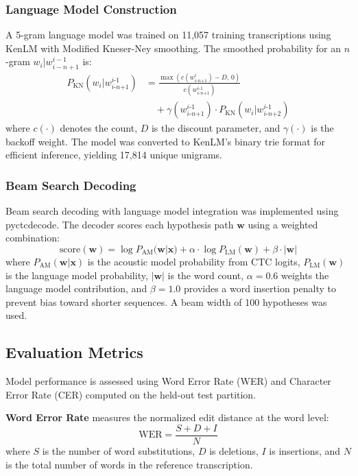 \documentclass[conference]{IEEEtran}
\begin{document}
\subsubsection{Language Model Construction}
A 5-gram language model was trained on 11,057 training transcriptions using KenLM \cite{b20} with Modified Kneser-Ney smoothing. The smoothed probability for an $n$-gram $w_i | w_{i-n+1}^{i-1}$ is:
\begin{align}
P_{\text{KN}}(w_i | w_{i\text{-}n\text{+}1}^{i\text{-}1}) &= \frac{\max(c(w_{i\text{-}n\text{+}1}^{i}) - D,\, 0)}{c(w_{i\text{-}n\text{+}1}^{i\text{-}1})} \nonumber \\
&\quad + \gamma(w_{i\text{-}n\text{+}1}^{i\text{-}1}) \cdot P_{\text{KN}}(w_i | w_{i\text{-}n\text{+}2}^{i\text{-}1})
\label{eq:kneserney}
\end{align}
where $c(\cdot)$ denotes the count, $D$ is the discount parameter, and $\gamma(\cdot)$ is the backoff weight. The model was converted to KenLM's binary trie format for efficient inference, yielding 17,814 unique unigrams.

\subsubsection{Beam Search Decoding}
Beam search decoding with language model integration was implemented using pyctcdecode. The decoder scores each hypothesis path $\mathbf{w}$ using a weighted combination:
\begin{equation}
\text{score}(\mathbf{w}) = \log P_{\text{AM}}(\mathbf{w} | \mathbf{x}) + \alpha \cdot \log P_{\text{LM}}(\mathbf{w}) + \beta \cdot |\mathbf{w}|
\label{eq:beam_score}
\end{equation}
where $P_{\text{AM}}(\mathbf{w} | \mathbf{x})$ is the acoustic model probability from CTC logits, $P_{\text{LM}}(\mathbf{w})$ is the language model probability, $|\mathbf{w}|$ is the word count, $\alpha = 0.6$ weights the language model contribution, and $\beta = 1.0$ provides a word insertion penalty to prevent bias toward shorter sequences. A beam width of 100 hypotheses was used.

\subsection{Evaluation Metrics}

Model performance is assessed using Word Error Rate (WER) and Character Error Rate (CER) computed on the held-out test partition.

\textbf{Word Error Rate} measures the normalized edit distance at the word level:
\begin{equation}
\text{WER} = \frac{S + D + I}{N}
\label{eq:wer}
\end{equation}
where $S$ is the number of word substitutions, $D$ is deletions, $I$ is insertions, and $N$ is the total number of words in the reference transcription.
\end{document}
